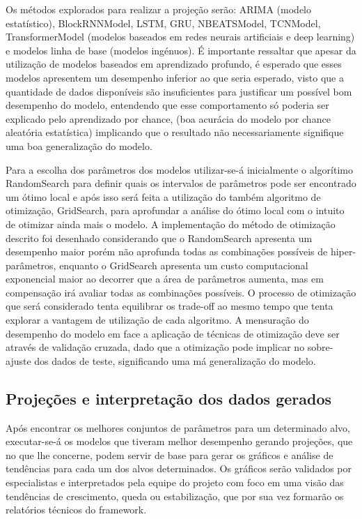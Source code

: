 Os métodos explorados para realizar a projeção serão: ARIMA (modelo estatístico), BlockRNNModel, LSTM, GRU, NBEATSModel, TCNModel,
TransformerModel (modelos baseados em redes neurais artificiais e deep learning) e modelos linha de base (modelos ingénuos). É importante ressaltar que apesar da utilização de modelos baseados em aprendizado profundo, é esperado que esses modelos apresentem um desempenho inferior ao que seria esperado, visto que a quantidade de dados disponíveis são insuficientes para justificar um possível bom desempenho do modelo, entendendo que esse comportamento só poderia ser explicado pelo aprendizado por chance, (boa acurácia do modelo por chance aleatória estatística) implicando que o resultado não necessariamente signifique uma boa generalização do modelo. 

Para a escolha dos parâmetros dos modelos utilizar-se-á inicialmente o algorítimo RandomSearch para definir quais os intervalos de parâmetros pode ser encontrado um ótimo local e após isso será feita a utilização do também algoritmo de otimização, GridSearch, para aprofundar a análise do ótimo local com o intuito de otimizar ainda mais o modelo. A implementação do método de otimização descrito foi desenhado considerando que o RandomSearch apresenta um desempenho maior porém não aprofunda todas as combinações possíveis de hiper-parâmetros, enquanto o GridSearch apresenta um custo computacional exponencial maior ao decorrer que a área de parâmetros aumenta, mas em compensação irá avaliar todas as combinações possíveis. O processo de otimização que será considerado tenta equilibrar os trade-off ao mesmo tempo que tenta explorar a vantagem de utilização de cada algoritmo. A mensuração do desempenho do modelo em face a aplicação de técnicas de otimização deve ser através de validação cruzada, dado que a otimização pode implicar no sobre-ajuste dos dados de teste, significando uma má generalização do modelo.

\subsection{Projeções e interpretação dos dados gerados}

Após encontrar os melhores conjuntos de parâmetros para um determinado alvo, executar-se-á os modelos que tiveram melhor desempenho gerando
projeções, que no que lhe concerne, podem servir de base para gerar os gráficos e análise de tendências para cada um dos alvos determinados.
Os gráficos serão validados por especialistas e interpretados pela equipe do projeto com foco em uma visão das tendências de crescimento, queda ou
estabilização, que por sua vez formarão os relatórios técnicos do framework.